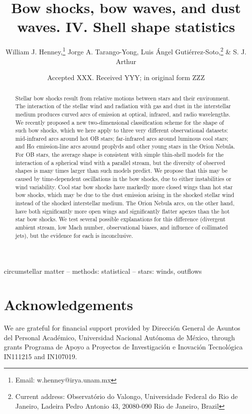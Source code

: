 \documentclass[useAMS, usenatbib, a4paper]{mnras}
\title[Bow shocks, bow waves, and dust waves. IV.] %
{Bow shocks, bow waves, and dust waves. IV. Shell shape statistics}
\author[Henney et al.]{
  William J. Henney,\thanks{Email: w.henney@irya.unam.mx}
  Jorge A. Tarango-Yong,
  Luis \'Angel Guti\'errez-Soto,\thanks{%
    Current address: Observatório do Valongo,
    Universidade Federal do Rio de Janeiro,
    Ladeira Pedro Antonio 43, 20080-090 Rio de Janeiro, Brazil}
  \& S. J. Arthur
  \\
  \AddressCRyA
}
\date{Accepted XXX. Received YYY; in original form ZZZ}
\begin{document}
\label{firstpage}
\pagerange{\pageref{firstpage}--\pageref{lastpage}}
\maketitle
\begin{abstract}
  Stellar bow shocks result from relative motions between stars and
  their environment. The interaction of the stellar wind and radiation
  with gas and dust in the interstellar medium produces curved arcs of
  emission at optical, infrared, and radio wavelengths.  We recently
  proposed a new two-dimensional classification scheme for the shape
  of such bow shocks, which we here apply to three very different
  observational datasets: mid-infrared arcs around hot OB stars;
  far-infrared arcs around luminous cool stars; and H\(\alpha\)
  emission-line arcs around proplyds and other young stars in the
  Orion Nebula.  For OB stars, the average shape is consistent with
  simple thin-shell models for the interaction of a spherical wind
  with a parallel stream, but the diversity of observed shapes is many
  times larger than such models predict.  We propose that this may be
  caused by time-dependent oscillations in the bow shocks, due to
  either instabilities or wind variability.  Cool star bow shocks have
  markedly more closed wings than hot star bow shocks, which may be
  due to the dust emission arising in the shocked stellar wind instead
  of the shocked interstellar medium.  The Orion Nebula arcs, on the
  other hand, have both significantly more open wings and
  significantly flatter apexes than the hot star bow shocks.  We test
  several possible explanations for this difference (divergent ambient
  stream, low Mach number, observational biases, and influence of
  collimated jets), but the evidence for each is inconclusive.
\end{abstract}

\begin{keywords}
  circumstellar matter -- methods: statistical -- stars: winds, outflows
\end{keywords}






\section*{Acknowledgements}
We are grateful for financial support provided by Dirección General de
Asuntos del Personal Académico, Universidad Nacional Autónoma de
México, through grants Programa de Apoyo a Proyectos de Investigación
e Inovación Tecnológica IN111215 and IN107019.  



\appendix



\bsp	%
\label{lastpage}
\end{document}
